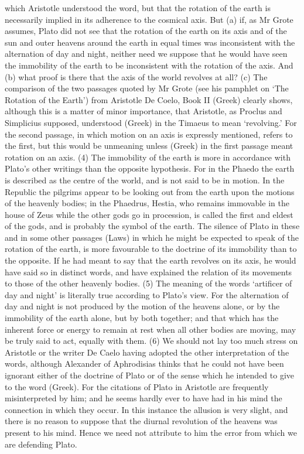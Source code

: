 which Aristotle understood the word, but that the rotation of the earth is
necessarily implied in its adherence to the cosmical axis. But (a) if, as
Mr Grote assumes, Plato did not see that the rotation of the earth on its
axis and of the sun and outer heavens around the earth in equal times was
inconsistent with the alternation of day and night, neither need we
suppose that he would have seen the immobility of the earth to be
inconsistent with the rotation of the axis. And (b) what proof is there
that the axis of the world revolves at all? (c) The comparison of the two
passages quoted by Mr Grote (see his pamphlet on ‘The Rotation of the
Earth’) from Aristotle De Coelo, Book II (Greek) clearly shows, although
this is a matter of minor importance, that Aristotle, as Proclus and
Simplicius supposed, understood (Greek) in the Timaeus to mean
‘revolving.’ For the second passage, in which motion on an axis is
expressly mentioned, refers to the first, but this would be unmeaning
unless (Greek) in the first passage meant rotation on an axis. (4) The
immobility of the earth is more in accordance with Plato’s other writings
than the opposite hypothesis. For in the Phaedo the earth is described as
the centre of the world, and is not said to be in motion. In the Republic
the pilgrims appear to be looking out from the earth upon the motions of
the heavenly bodies; in the Phaedrus, Hestia, who remains immovable in the
house of Zeus while the other gods go in procession, is called the first
and eldest of the gods, and is probably the symbol of the earth. The
silence of Plato in these and in some other passages (Laws) in which he
might be expected to speak of the rotation of the earth, is more
favourable to the doctrine of its immobility than to the opposite. If he
had meant to say that the earth revolves on its axis, he would have said
so in distinct words, and have explained the relation of its movements to
those of the other heavenly bodies. (5) The meaning of the words
‘artificer of day and night’ is literally true according to Plato’s view.
For the alternation of day and night is not produced by the motion of the
heavens alone, or by the immobility of the earth alone, but by both
together; and that which has the inherent force or energy to remain at
rest when all other bodies are moving, may be truly said to act, equally
with them. (6) We should not lay too much stress on Aristotle or the
writer De Caelo having adopted the other interpretation of the words,
although Alexander of Aphrodisias thinks that he could not have been
ignorant either of the doctrine of Plato or of the sense which he intended
to give to the word (Greek). For the citations of Plato in Aristotle are
frequently misinterpreted by him; and he seems hardly ever to have had in
his mind the connection in which they occur. In this instance the allusion
is very slight, and there is no reason to suppose that the diurnal
revolution of the heavens was present to his mind. Hence we need not
attribute to him the error from which we are defending Plato.


